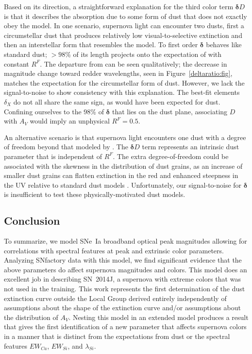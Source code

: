 \documentclass{aastex61}   	%
\begin{document}
Based on its direction, a straightforward explanation for the third color term $\pmb{\delta} D$ is that it describes the absorption due to some form of dust
that does not exactly obey the   model.
In one scenario,
supernova light can encounter two
dusts, first a 
circumstellar dust that produces relatively low visual-to-selective extinction
\citep{2008ApJ...686L.103G} and then
an interstellar form  that resembles the  model.
To first order $\pmb{\delta}$ behaves like standard dust;   $>98$\% of its length projects onto the expectation of  
with constant $R^F$.
The departure from   
can be seen qualitatively; the decrease in magnitude change toward redder wavelengths, seen in Figure~\ref{deltaratio:fig}, matches the 
expectation for the circumstellar form of dust.
However, we
lack the signal-to-noise to show consistency with this explanation.
The best-fit elements $\delta_X$ do not all share the same sign, as would have been expected for dust.
Confining ourselves to the 98\% of   $\pmb{\delta}$ that lies on the dust plane, associating 
$D$ with $A_V$ would imply an unphysical $R^F=0.5$.

An alternative scenario is that supernova light encounters one dust with a degree of freedom beyond that modeled by .
The $\pmb{\delta} D$ term represents an intrinsic dust parameter that is independent of $R^F$.
The extra degree-of-freedom could be associated with the skewness in the distribution of dust grains, as an increase of smaller dust grains
can flatten extinction in the red and enhanced steepness in the UV relative to standard dust models  \citep[Figure~3 in][]{2015ApJ...807L..26G,
2017ApJ...836...13H}.
Unfortunately, our signal-to-noise for $\pmb{\delta}$ is insufficient to test these physically-motivated
dust models.
\color{red}
\color{black}


\subsection{Conclusion}
To summarize, we model SNe~Ia broadband optical peak magnitudes allowing for correlations with spectral features at peak and
extrinsic color parameters.  Analyzing SNfactory data with this model, we find significant evidence that the above parameters do
affect supernova magnitudes and colors.  This model  does an excellent job in
describing SN~2014J, a supernova with extreme colors that was not used in the training.  
This work represents the first determination of the dust extinction curve outside the Local Group
derived entirely independently of assumptions about the shape of the extinction curve and/or assumptions about the
distribution of $A_V$.  
Nesting this model in an extended model produces a result that 
gives the first identification of  a new parameter that affects supernova
colors in a manner that is distinct from the expectations from dust or the spectral features $EW_{Ca}$, $EW_{Si}$, and $\lambda_{Si}$.
\end{document}
